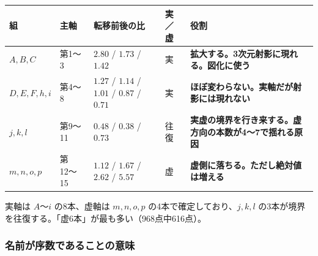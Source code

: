 \documentclass[
  10pt,
]{ltjsarticle}
\newcounter{none} %
\begin{document}
{\def\LTcaptype{none} %
\begin{longtable}[]{@{}
  >{\raggedright\arraybackslash}p{}
  >{\raggedright\arraybackslash}p{}
  >{\raggedright\arraybackslash}p{}
  >{\raggedright\arraybackslash}p{}
  >{\raggedright\arraybackslash}p{}@{}}
\toprule\noalign{}
\begin{minipage}[b]{\linewidth}\raggedright
組
\end{minipage} & \begin{minipage}[b]{\linewidth}\raggedright
主軸
\end{minipage} & \begin{minipage}[b]{\linewidth}\raggedright
転移前後の比
\end{minipage} & \begin{minipage}[b]{\linewidth}\raggedright
実／虚
\end{minipage} & \begin{minipage}[b]{\linewidth}\raggedright
役割
\end{minipage} \\
\midrule\noalign{}
\endhead
\bottomrule\noalign{}
\endlastfoot
\textbf{\(A, B, C\)} & 第1〜3 & \(2.80\) / \(1.73\) / \(1.42\) & 実 &
\textbf{拡大する。3次元射影に現れる。図化に使う} \\
\textbf{\(D, E, F, h, i\)} & 第4〜8 & \(1.27\) / \(1.14\) / \(1.01\) /
\(0.87\) / \(0.71\) & 実 &
\textbf{ほぼ変わらない。実軸だが射影には現れない} \\
\textbf{\(j, k, l\)} & 第9〜11 & \(0.48\) / \(0.38\) / \(0.73\) & 往復 &
\textbf{実虚の境界を行き来する。虚方向の本数が4〜7で揺れる原因} \\
\textbf{\(m, n, o, p\)} & 第12〜15 & \(1.12\) / \(1.67\) / \(2.62\) /
\(5.57\) & 虚 & \textbf{虚側に落ちる。ただし絶対値は増える} \\
\end{longtable}
}

実軸は \(A\)〜\(i\) の8本、虚軸は \(m,n,o,p\)
の4本で確定しており、\(j,k,l\)
の3本が境界を往復する。「虚6本」が最も多い（968点中616点）。

\subsubsection{名前が序数であることの意味}\label{ux540dux524dux304cux5e8fux6570ux3067ux3042ux308bux3053ux3068ux306eux610fux5473}
\end{document}
